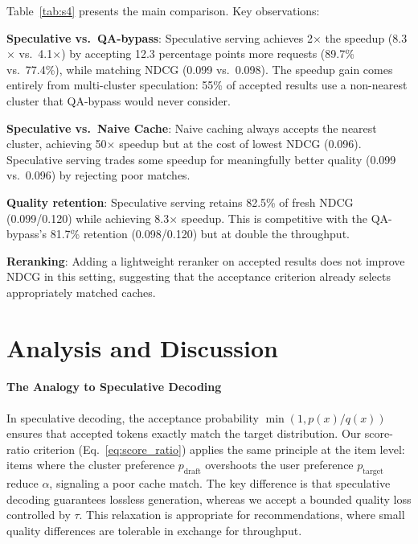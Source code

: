 \documentclass{article}
\begin{document}
Table~\ref{tab:s4} presents the main comparison. Key observations:

\textbf{Speculative vs.\ QA-bypass}: Speculative serving achieves 2$\times$ the speedup (8.3$\times$ vs.\ 4.1$\times$) by accepting 12.3 percentage points more requests (89.7\% vs.\ 77.4\%), while matching NDCG (0.099 vs.\ 0.098). The speedup gain comes entirely from multi-cluster speculation: 55\% of accepted results use a non-nearest cluster that QA-bypass would never consider.

\textbf{Speculative vs.\ Naive Cache}: Naive caching always accepts the nearest cluster, achieving 50$\times$ speedup but at the cost of lowest NDCG (0.096). Speculative serving trades some speedup for meaningfully better quality (0.099 vs.\ 0.096) by rejecting poor matches.

\textbf{Quality retention}: Speculative serving retains 82.5\% of fresh NDCG (0.099/0.120) while achieving 8.3$\times$ speedup. This is competitive with the QA-bypass's 81.7\% retention (0.098/0.120) but at double the throughput.

\textbf{Reranking}: Adding a lightweight reranker on accepted results does not improve NDCG in this setting, suggesting that the acceptance criterion already selects appropriately matched caches.

\section{Analysis and Discussion}
\label{sec:discussion}

\paragraph{The Analogy to Speculative Decoding}
In speculative decoding, the acceptance probability $\min(1, p(x)/q(x))$ ensures that accepted tokens exactly match the target distribution. Our score-ratio criterion (Eq.~\ref{eq:score_ratio}) applies the same principle at the item level: items where the cluster preference $p_{\text{draft}}$ overshoots the user preference $p_{\text{target}}$ reduce $\alpha$, signaling a poor cache match. The key difference is that speculative decoding guarantees lossless generation, whereas we accept a bounded quality loss controlled by $\tau$. This relaxation is appropriate for recommendations, where small quality differences are tolerable in exchange for throughput.
\end{document}
